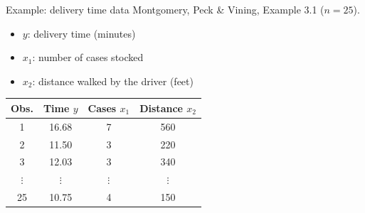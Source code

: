 \begin{frame}{Example: delivery time data}
    Montgomery, Peck \& Vining, Example 3.1 ($n=25$).
    \begin{itemize}
        \item $y$: delivery time (minutes)
        \item $x_1$: number of cases stocked
        \item $x_2$: distance walked by the driver (feet)
    \end{itemize}
    \begin{center}
        \begin{tabular}{cccc}
            \toprule
            Obs. & Time $y$ & Cases $x_1$ & Distance $x_2$ \\
            \midrule
            1  & 16.68 & 7 & 560 \\
            2  & 11.50 & 3 & 220 \\
            3  & 12.03 & 3 & 340 \\
            $\vdots$ & $\vdots$ & $\vdots$ & $\vdots$ \\
            25 & 10.75 & 4 & 150 \\
            \bottomrule
        \end{tabular}
    \end{center}
\end{frame}


